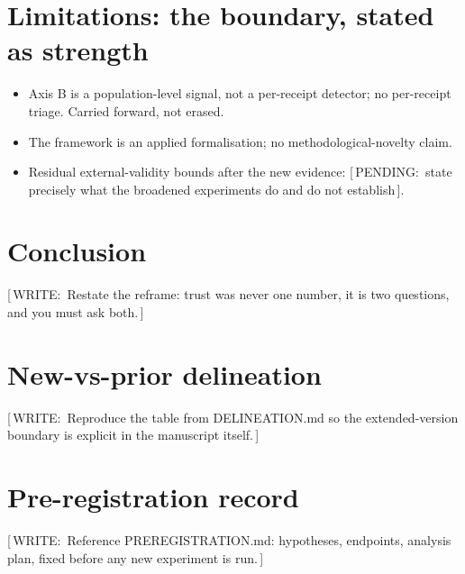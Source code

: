 \documentclass[10pt,twocolumn,a4paper]{article}
\newcommand{\priorfact}[1]{#1}
\newcommand{\pending}[1]{{\small\sffamily\color{pendingclr}[\,PENDING:\ #1\,]}}
\newcommand{\todo}[1]{{\small\sffamily\color{writeclr}[\,WRITE:\ #1\,]}}
\begin{document}
\section{Limitations: the boundary, stated as strength}
\label{sec:limitations}
\begin{itemize}
  \item \priorfact{Axis B is a population-level signal, not a per-receipt
  detector; no per-receipt triage. Carried forward, not erased.}
  \item \priorfact{The framework is an applied formalisation; no
  methodological-novelty claim.}
  \item Residual external-validity bounds after the new evidence:
  \pending{state precisely what the broadened experiments do and do not establish}.
\end{itemize}

\section{Conclusion}
\label{sec:conclusion}
\todo{Restate the reframe: trust was never one number, it is two questions,
and you must ask both.}

\appendix
\section{New-vs-prior delineation}
\label{app:delineation}
\todo{Reproduce the table from DELINEATION.md so the extended-version
boundary is explicit in the manuscript itself.}

\section{Pre-registration record}
\label{app:prereg}
\todo{Reference PREREGISTRATION.md: hypotheses, endpoints, analysis plan,
fixed before any new experiment is run.}



\end{document}
